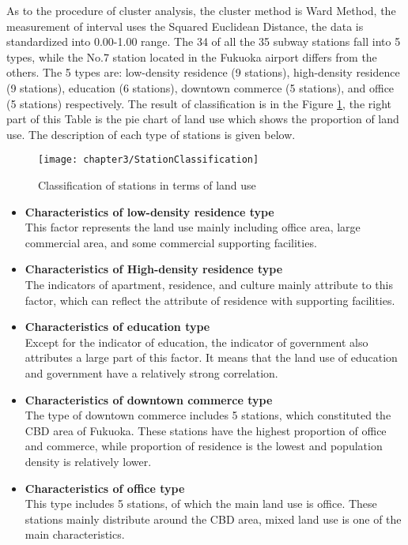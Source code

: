 %
As to the procedure of cluster analysis, the cluster method is Ward Method, the measurement of interval uses the Squared Euclidean Distance, the data is standardized into 0.00-1.00 range. The 34 of all the 35 subway stations fall into 5 types, while the No.7 station located in the Fukuoka airport differs from the others. The 5 types are: low-density residence (9 stations), high-density residence (9 stations), education (6 stations), downtown commerce (5 stations), and office (5 stations) respectively. The result of classification is in the Figure \ref{fig:chp3:StationClassification}, the right part of this Table is the pie chart of land use which shows the proportion of land use. The description of each type of stations is given below. 

%
\begin{figure}[htbp]
	\centering
	\texttt{[image: chapter3/StationClassification]}
	\caption{Classification of stations in terms of land use}
	\label{fig:chp3:StationClassification}
\end{figure}

%
\begin{itemize}
	\item \textbf{Characteristics of low-density residence type} \\
	This factor represents the land use mainly including office area, large commercial area, and some commercial supporting facilities.
	
	\item \textbf{Characteristics of High-density residence type} \\
	The indicators of apartment, residence, and culture mainly attribute to this factor, which can reflect the attribute of residence with supporting facilities.
	
	\item \textbf{Characteristics of education type} \\
	Except for the indicator of education, the indicator of government also attributes a large part of this factor. It means that the land use of education and government have a relatively strong correlation.
	
	\item \textbf{Characteristics of downtown commerce type} \\
	The type of downtown commerce includes 5 stations, which constituted the CBD area of Fukuoka. These stations have the highest proportion of office and commerce, while proportion of residence is the lowest and population density is relatively lower.
	
	\item \textbf{Characteristics of office type} \\
	This type includes 5 stations, of which the main land use is office. These stations mainly distribute around the CBD area, mixed land use is one of the main characteristics.
\end{itemize}

